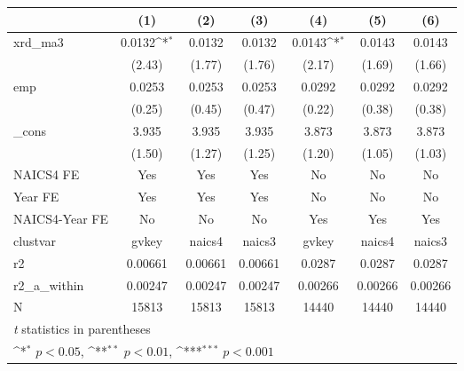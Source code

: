 {
\def\sym#1{\ifmmode^{#1}\else\(^{#1}\)\fi}
\begin{tabular}{l*{6}{c}}
\hline\hline
            &\multicolumn{1}{c}{(1)}         &\multicolumn{1}{c}{(2)}         &\multicolumn{1}{c}{(3)}         &\multicolumn{1}{c}{(4)}         &\multicolumn{1}{c}{(5)}         &\multicolumn{1}{c}{(6)}         \\
\hline
xrd\_ma3     &      0.0132\sym{*}  &      0.0132         &      0.0132         &      0.0143\sym{*}  &      0.0143         &      0.0143         \\
            &      (2.43)         &      (1.77)         &      (1.76)         &      (2.17)         &      (1.69)         &      (1.66)         \\
[1em]
emp         &      0.0253         &      0.0253         &      0.0253         &      0.0292         &      0.0292         &      0.0292         \\
            &      (0.25)         &      (0.45)         &      (0.47)         &      (0.22)         &      (0.38)         &      (0.38)         \\
[1em]
\_cons      &       3.935         &       3.935         &       3.935         &       3.873         &       3.873         &       3.873         \\
            &      (1.50)         &      (1.27)         &      (1.25)         &      (1.20)         &      (1.05)         &      (1.03)         \\
[1em]
NAICS4 FE   &         Yes         &         Yes         &         Yes         &          No         &          No         &          No         \\
[1em]
Year FE     &         Yes         &         Yes         &         Yes         &          No         &          No         &          No         \\
[1em]
NAICS4-Year FE&          No         &          No         &          No         &         Yes         &         Yes         &         Yes         \\
\hline
clustvar    &       gvkey         &      naics4         &      naics3         &       gvkey         &      naics4         &      naics3         \\
r2          &     0.00661         &     0.00661         &     0.00661         &      0.0287         &      0.0287         &      0.0287         \\
r2\_a\_within &     0.00247         &     0.00247         &     0.00247         &     0.00266         &     0.00266         &     0.00266         \\
N           &       15813         &       15813         &       15813         &       14440         &       14440         &       14440         \\
\hline\hline
\multicolumn{7}{l}{\footnotesize \textit{t} statistics in parentheses}\\
\multicolumn{7}{l}{\footnotesize \sym{*} \(p<0.05\), \sym{**} \(p<0.01\), \sym{***} \(p<0.001\)}\\
\end{tabular}
}

